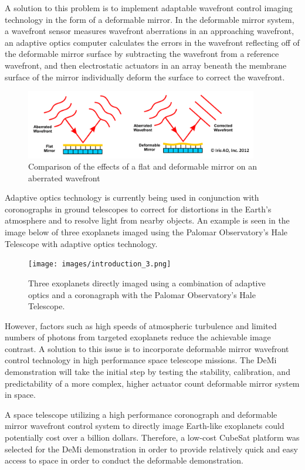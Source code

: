 \documentclass[12pt]{article}
\begin{document}
A solution to this problem is to implement adaptable wavefront control imaging technology in the form of a deformable mirror.  In the deformable mirror system, a wavefront sensor measures wavefront aberrations in an approaching wavefront, an adaptive optics computer calculates the errors in the wavefront reflecting off of the deformable mirror surface by subtracting the wavefront from a reference wavefront, and then electrostatic actuators in an array beneath the membrane surface of the mirror individually deform the surface to correct the wavefront.   

\begin{figure}[!ht]
\centering
\includegraphics[width=4in]{images/introduction_2.png}
\caption{Comparison of the effects of a flat and deformable mirror on an aberrated wavefront}
\label{fig:Intro_wavefront}
\end{figure}

Adaptive optics technology is currently being used in conjunction with coronographs in ground telescopes to correct for distortions in the Earth’s atmosphere and to resolve light from nearby objects.  An example is seen in the image below of three exoplanets imaged using the Palomar Observatory’s Hale Telescope with adaptive optics technology.  


\begin{figure}[!ht]
\centering
\texttt{[image: images/introduction\_3.png]}
\caption{Three exoplanets directly imaged using a combination of adaptive optics and a coronagraph with the Palomar Observatory’s Hale Telescope.}
\label{fig:Intro_exo}
\end{figure}

However, factors such as high speeds of atmospheric turbulence and limited numbers of photons from targeted exoplanets reduce the achievable image contrast.  A solution to this issue is to incorporate deformable mirror wavefront control technology in high performance space telescope missions.  The DeMi demonstration will take the initial step by testing the stability, calibration, and predictability of a more complex, higher actuator count deformable mirror system in space.   

A space telescope utilizing a high performance coronograph and deformable mirror wavefront control system to directly image Earth-like exoplanets could potentially cost over a billion dollars.  Therefore, a low-cost CubeSat platform was selected for the DeMi demonstration in order to provide relatively quick and easy access to space in order to conduct the deformable demonstration. 
\end{document}
